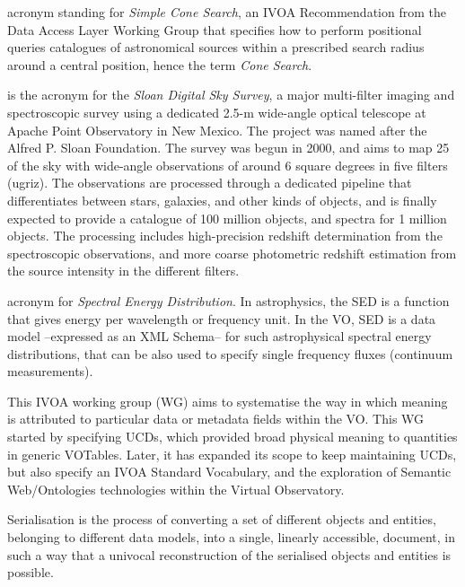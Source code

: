 {
    	acronym standing for \emph{Simple Cone Search}, an \gls{IVOA}
        \gls{Recommendation} from the \gls{Data Access Layer}
        \gls{Working Group} that specifies how to perform positional
        queries catalogues of astronomical sources within a prescribed
        search radius around a central position, hence the term
        \emph{Cone Search}.
}

{
    	is the acronym for the \emph{Sloan Digital Sky Survey}, a major
        multi-filter imaging and spectroscopic survey using a dedicated
        2.5-m wide-angle optical telescope at Apache Point Observatory
        in New Mexico. The project was named after the Alfred P. Sloan
        Foundation. The survey was begun in 2000, and aims to map 25%
        of the sky with wide-angle observations of around 6 square
        degrees in five filters (ugriz). The observations are processed
        through a dedicated pipeline that differentiates between stars,
        galaxies, and other kinds of objects, and is finally expected
        to provide a catalogue of 100 million objects, and spectra for
        1 million objects. The processing includes high-precision
        redshift determination from the spectroscopic observations, and
        more coarse photometric redshift estimation from the source
        intensity in the different filters.
}

{
    	acronym for \emph{Spectral Energy Distribution}. In
        astrophysics, the SED is a function that gives energy per
        wavelength or frequency unit. In the \gls{VO}, SED is a data
        model --expressed as an \gls{XML} \gls{Schema}-- for such
        astrophysical spectral energy distributions, that can be also
        used to specify single frequency fluxes (continuum
        measurements).
}

{
    	This \gls{IVOA} working group (WG) aims to systematise the way
        in which meaning is attributed to particular data or metadata
        fields within the VO. This WG started by specifying \gls{UCD}s,
        which provided broad physical meaning to quantities in generic
        \gls{VOTable}s. Later, it has expanded its scope to keep
        maintaining UCDs, but also specify an IVOA Standard Vocabulary,
        and the exploration of Semantic Web/Ontologies technologies
        within the Virtual Observatory.
}

{
    	Serialisation is the process of converting a set of different
        objects and entities, belonging to different data models, into
        a single, linearly accessible, document, in such a way that a
        univocal reconstruction of the serialised objects and entities
        is possible.
}

